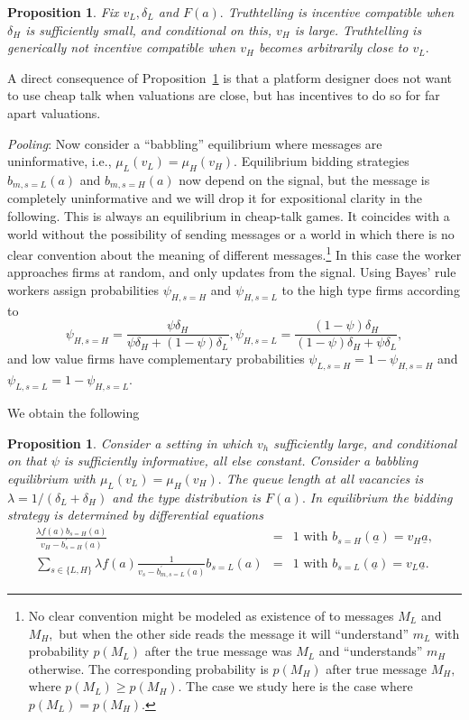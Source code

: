 \documentclass[12pt]{article}
\newtheorem{proposition}[theorem]{Proposition}
\begin{document}
\begin{proposition} \label{prop:gap_incentive_compat}
  Fix $v_{L},\delta _{L}$ and $F(a).$
  Truthtelling is incentive compatible when $\delta _{H}$ is sufficiently small, and conditional on this, $v_{H}$ is large.
  Truthtelling is generically not incentive compatible when $v_{H}$ becomes arbitrarily close to $v_{L}.$
\end{proposition}

A direct consequence of Proposition~\ref{prop:gap_incentive_compat} is that a platform designer does not want to use cheap talk when valuations are close, but has incentives to do so for far apart valuations.

\bigskip

\textit{Pooling}: Now consider a ``babbling'' equilibrium where messages are uninformative, i.e., $\mu _{L}(v_{L})=\mu _{H}(v_{H}).$
Equilibrium bidding strategies $b_{m,s=L}(a)$ and $b_{m,s=H}(a)$ now depend on the signal, but the message is completely uninformative and we will drop it for expositional clarity in the following.
This is always an equilibrium in cheap-talk games.
It coincides with a world without the possibility of sending messages or a world in which there is no clear convention about the meaning of different messages.\footnote{%
  No clear convention might be modeled as existence of to messages $M_{L}$ and $M_{H},$ but when the other side reads the message it will ``understand'' $m_{L}$ with probability $p(M_{L})$ after the true message was $M_{L}$ and ``understands'' $m_{H}$ otherwise. The corresponding probability is $p\left(M_{H}\right) $ after true message $M_{H},$ where $p(M_{L})\geq p(M_{H}).$
  The case we study here is the case where $p(M_{L})=p(M_{H}).$
}
In this case the worker approaches firms at random, and only updates from the signal.
Using Bayes' rule workers assign probabilities $\psi _{H,s=H}$ and $\psi_{H,s=L}$ to the high type firms according to 
\[
\psi _{H,s=H}=\frac{\psi \delta _{H}}{\psi \delta _{H}+(1-\psi )\delta _{L}}%
,\psi _{H,s=L}=\frac{(1-\psi )\delta _{H}}{(1-\psi )\delta _{H}+\psi \delta
_{L}}, 
\]%
and low value firms have complementary probabilities $\psi _{L,s=H}=1-\psi_{H,s=H}$ and $\psi _{L,s=L}=1-\psi _{H,s=L}.$

We obtain the following 

\begin{proposition} \label{bid-signal-low}
  Consider a setting in which $v_{h}$ sufficiently large, and conditional on that $\psi $ is sufficiently informative, all else constant.
  Consider a babbling equilibrium with $\mu _{L}(v_{L})=\mu _{H}(v_{H}).$
  The queue length at all vacancies is $\lambda =1/(\delta _{L}+\delta _{H})$ and the type distribution is $F(a).$
  In equilibrium the bidding strategy is determined by differential equations 
\begin{eqnarray}
\frac{\lambda f(a)b_{s=H}(a)}{v_{H}-b_{s=H}^{\prime }(a)} &=&1\text{ with }%
b_{s=H}(\underline{a})=v_{H}\underline{a},  \label{bid-signal-high} \\
\sum_{s\in \{L,H\}}\lambda f(a)\frac{1}{v_{s}-b_{m,s=L}^{\prime }(a)}%
b_{s=L}(a) &=&1\text{ with }b_{s=L}(\underline{a})=v_{L}\underline{a}.
\end{eqnarray}
\end{proposition}
\end{document}
